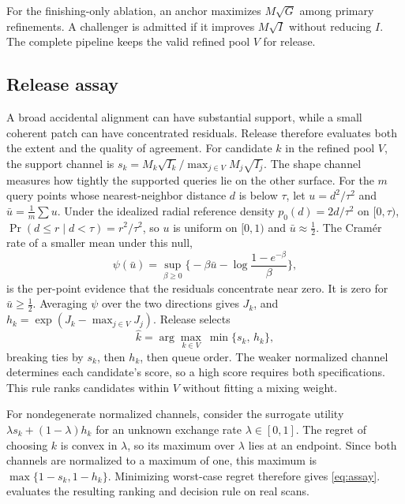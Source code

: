 For the finishing-only ablation, an anchor maximizes $M\sqrt G$ among primary refinements. A challenger is admitted if it improves $M\sqrt I$ without reducing $I$. The complete pipeline keeps the valid refined pool $V$ for release.

\subsection{Release assay}
\label{sec:assay}

A broad accidental alignment can have substantial support, while a small coherent patch can have concentrated residuals. Release therefore evaluates both the extent and the quality of agreement. For candidate $k$ in the refined pool $V$, the support channel is $s_k=M_k\sqrt{I_k}/\max_{j\in V}M_j\sqrt{I_j}$. The shape channel measures how tightly the supported queries lie on the other surface. For the $m$ query points whose nearest-neighbor distance $d$ is below $\tau$, let $u=d^2/\tau^2$ and $\bar u=\frac1m\sum u$. Under the idealized radial reference density $p_0(d)=2d/\tau^2$ on $[0,\tau)$, $\Pr(d\le r\mid d<\tau)=r^2/\tau^2$, so $u$ is uniform on $[0,1)$ and $\bar u\approx\frac12$. The Cram\'er rate of a smaller mean under this null,
\begin{equation}
\psi(\bar u)=\sup_{\beta\ge0}\Big\{-\beta\bar u-\log\frac{1-e^{-\beta}}{\beta}\Big\},
\label{eq:psi}
\end{equation}
is the per-point evidence that the residuals concentrate near zero. It is zero for $\bar u\ge\frac12$. Averaging $\psi$ over the two directions gives $J_k$, and $h_k=\exp(J_k-\max_{j\in V}J_j)$. Release selects
\begin{equation}
\hat k=\arg\max_{k\in V}\ \min\{s_k,\,h_k\},
\label{eq:assay}
\end{equation}
breaking ties by $s_k$, then $h_k$, then queue order. The weaker normalized channel determines each candidate's score, so a high score requires both specifications. This rule ranks candidates within $V$ without fitting a mixing weight.

For nondegenerate normalized channels, consider the surrogate utility $\lambda s_k+(1-\lambda)h_k$ for an unknown exchange rate $\lambda\in[0,1]$. The regret of choosing $k$ is convex in $\lambda$, so its maximum over $\lambda$ lies at an endpoint. Since both channels are normalized to a maximum of one, this maximum is $\max\{1-s_k,1-h_k\}$. Minimizing worst-case regret therefore gives \cref{eq:assay}.  evaluates the resulting ranking and decision rule on real scans.

